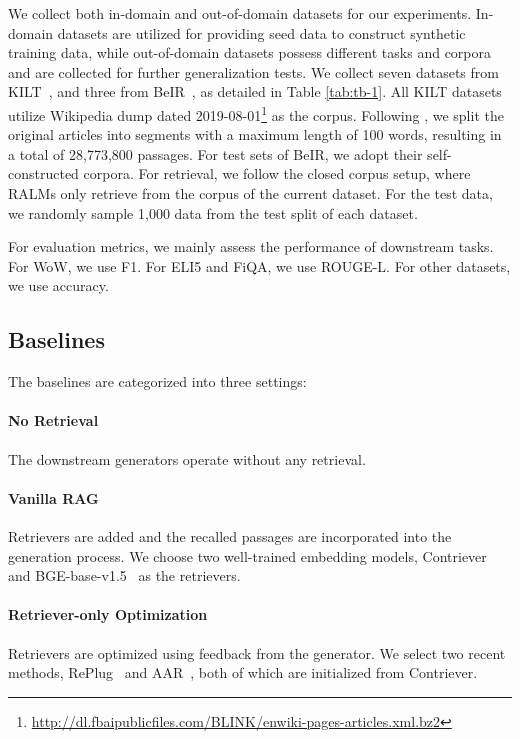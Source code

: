 \documentclass[11pt]{article}
\begin{document}
We collect both in-domain and out-of-domain datasets for our experiments. In-domain datasets are utilized for providing seed data to construct synthetic training data, while out-of-domain datasets possess different tasks and corpora and are collected for further generalization tests. We collect seven datasets from KILT~\citep{petroni-etal-2021-kilt}, and three from BeIR~\citep{thakur2021beirheterogenousbenchmarkzeroshot}, as detailed in Table \ref{tab:tb-1}. All KILT datasets utilize Wikipedia dump dated 2019-08-01\footnote{\url{http://dl.fbaipublicfiles.com/BLINK/enwiki-pages-articles.xml.bz2}} as the corpus. Following \citet{wang-etal-2019-multi}, we split the original articles into segments with a maximum length of 100 words, resulting in a total of 28,773,800 passages. For test sets of BeIR, we adopt their self-constructed corpora. For retrieval, we follow the closed corpus setup\citep{tart}, where RALMs only retrieve from the corpus of the current dataset. For the test data, we randomly sample 1,000 data from the test split of each dataset.

For evaluation metrics, we mainly assess the performance of downstream tasks. For WoW, we use F1. For ELI5 and FiQA, we use ROUGE-L. For other datasets, we use accuracy. 








\subsection{Baselines}
\label{sec:4-2}

The baselines are categorized into three settings:

\paragraph{No Retrieval} The downstream generators operate without any retrieval.

\paragraph{Vanilla RAG} Retrievers are added and the recalled passages are incorporated into the generation process. We choose two well-trained embedding models, Contriever~\citep{contriever} and BGE-base-v1.5~\citep{bge_embedding} as the retrievers.

\paragraph{Retriever-only Optimization} Retrievers are optimized using feedback from the generator. We select two recent methods, RePlug~\citep{replug} and AAR~\citep{aar}, both of which are initialized from Contriever.
\end{document}

